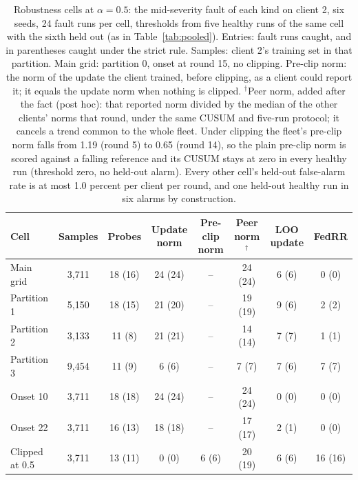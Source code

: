 \begin{table}[t]
\centering
\footnotesize
\setlength{\tabcolsep}{3pt}
\begin{tabular}{lccccccc}
\toprule
Cell & Samples & Probes & Update norm & Pre-clip norm & Peer norm$^\dagger$ & LOO update & FedRR \\
\midrule
Main grid & 3,711 & 18 (16) & 24 (24) & -- & 24 (24) & 6 (6) & 0 (0) \\
Partition 1 & 5,150 & 18 (15) & 21 (20) & -- & 19 (19) & 9 (6) & 2 (2) \\
Partition 2 & 3,133 & 11 (8) & 21 (21) & -- & 14 (14) & 7 (7) & 1 (1) \\
Partition 3 & 9,454 & 11 (9) & 6 (6) & -- & 7 (7) & 7 (6) & 7 (7) \\
Onset 10 & 3,711 & 18 (18) & 24 (24) & -- & 24 (24) & 0 (0) & 0 (0) \\
Onset 22 & 3,711 & 16 (13) & 18 (18) & -- & 17 (17) & 2 (1) & 0 (0) \\
Clipped at 0.5 & 3,711 & 13 (11) & 0 (0) & 6 (6) & 20 (19) & 6 (6) & 16 (16) \\
\bottomrule
\end{tabular}
\caption{Robustness cells at $\alpha = 0.5$: the mid-severity fault of each kind on client 2, six seeds, 24 fault runs per cell, thresholds from five healthy runs of the same cell with the sixth held out (as in Table~\ref{tab:pooled}). Entries: fault runs caught, and in parentheses caught under the strict rule. Samples: client 2's training set in that partition. Main grid: partition 0, onset at round 15, no clipping. Pre-clip norm: the norm of the update the client trained, before clipping, as a client could report it; it equals the update norm when nothing is clipped. $^\dagger$Peer norm, added after the fact (post hoc): that reported norm divided by the median of the other clients' norms that round, under the same CUSUM and five-run protocol; it cancels a trend common to the whole fleet. Under clipping the fleet's pre-clip norm falls from 1.19 (round 5) to 0.65 (round 14), so the plain pre-clip norm is scored against a falling reference and its CUSUM stays at zero in every healthy run (threshold zero, no held-out alarm). Every other cell's held-out false-alarm rate is at most 1.0 percent per client per round, and one held-out healthy run in six alarms by construction.}
\label{tab:robust}
\end{table}
